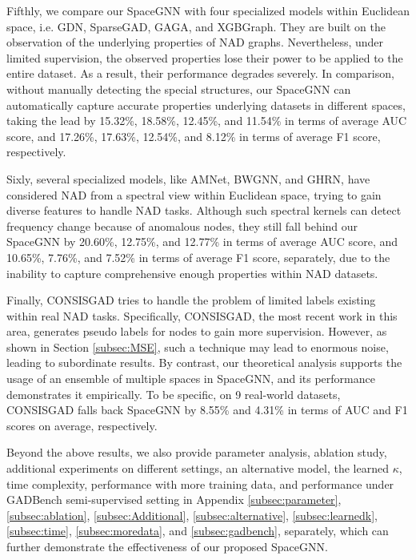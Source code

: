 


Fifthly, we compare our SpaceGNN with four specialized models within Euclidean space, i.e. GDN, SparseGAD, GAGA, and XGBGraph. They are built on the observation of the underlying properties of NAD graphs. Nevertheless, under limited supervision, the observed properties lose their power to be applied to the entire dataset. As a result, their performance degrades severely. In comparison, without manually detecting the special structures, our SpaceGNN can automatically capture accurate properties underlying datasets in different spaces, taking the lead by 15.32\%, 18.58\%, 12.45\%, and 11.54\% in terms of average AUC score, and 17.26\%, 17.63\%, 12.54\%, and 8.12\% in terms of average F1 score, respectively. 


Sixly, several specialized models, like AMNet, BWGNN, and GHRN, have considered NAD from a spectral view within Euclidean space, trying to gain diverse features to handle NAD tasks. Although such spectral kernels can detect frequency change because of anomalous nodes, they still fall behind our SpaceGNN by 20.60\%, 12.75\%, and 12.77\% in terms of average AUC score, and 10.65\%, 7.76\%, and 7.52\% in terms of average F1 score, separately, due to the inability to capture comprehensive enough properties within NAD datasets. 

Finally, CONSISGAD tries to handle the problem of limited labels existing within real NAD tasks. Specifically, CONSISGAD, the most recent work in this area, generates pseudo labels for nodes to gain more supervision. However, as shown in Section \ref{subsec:MSE}, such a technique may lead to enormous noise, leading to subordinate results. By contrast, our theoretical analysis supports the usage of an ensemble of multiple spaces in SpaceGNN, and its performance demonstrates it empirically. To be specific, on 9 real-world datasets, CONSISGAD falls back SpaceGNN by 8.55\% and 4.31\% in terms of AUC and F1 scores on average, respectively.


Beyond the above results, we also provide parameter analysis, ablation study, additional experiments on different settings, an alternative model, the learned $\kappa$, time complexity, performance with more training data, and performance under GADBench \citep{gadbench23tang} semi-supervised setting in Appendix \ref{subsec:parameter}, \ref{subsec:ablation}, \ref{subsec:Additional}, \ref{subsec:alternative}, \ref{subsec:learnedk}, \ref{subsec:time}, \ref{subsec:moredata}, and \ref{subsec:gadbench}, separately, which can further demonstrate the effectiveness of our proposed SpaceGNN. 